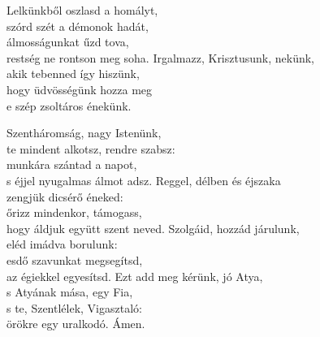 \documentclass[twoside]{article}
\begin{document}
\begin{hymnstanzas}
    Lelkünkből oszlasd a homályt,\\
    szórd szét a démonok hadát,\\
    álmosságunkat űzd tova,\\
    restség ne rontson meg soha.
\stanzabreak
    Irgalmazz, Krisztusunk, nekünk,\\
    akik tebenned így hiszünk,\\
    hogy üdvösségünk hozza meg\\
    e szép zsoltáros énekünk.
\end{hymnstanzas}
\begin{hymnstanzas}
    Szentháromság, nagy Istenünk,\\
    te mindent alkotsz, rendre szabsz:\\
    munkára szántad a napot,\\
    s éjjel nyugalmas álmot adsz.
\stanzabreak
    Reggel, délben és éjszaka\\
    zengjük dicsérő éneked:\\
    őrizz mindenkor, támogass,\\
    hogy áldjuk együtt szent neved.
\stanzabreak
    Szolgáid, hozzád járulunk,\\
    eléd imádva borulunk:\\
    esdő szavunkat megsegítsd,\\
    az égiekkel egyesítsd.
\stanzabreak
    Ezt add meg kérünk, jó Atya,\\
    s Atyának mása, egy Fia,\\
    s te, Szentlélek, Vigasztaló:\\
    örökre egy uralkodó. Ámen.
\end{hymnstanzas}
\end{document}

